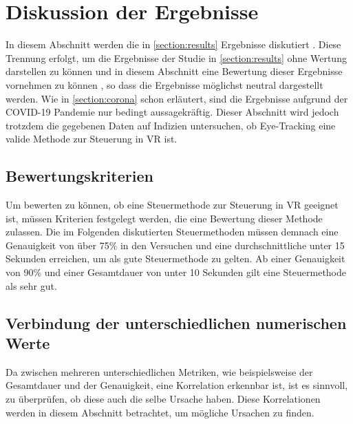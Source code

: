 
\chapter{Diskussion der Ergebnisse}
\label{section:discoussion}
In diesem Abschnitt werden die in \autoref{section:results} Ergebnisse diskutiert . Diese Trennung erfolgt, um die Ergebnisse der Studie in \autoref{section:results} ohne Wertung darstellen zu können und in diesem Abschnitt eine Bewertung dieser Ergebnisse  vornehmen zu können , so dass die Ergebnisse möglichst neutral dargestellt werden. Wie in \autoref{section:corona} schon erläutert, sind die Ergebnisse aufgrund der COVID-19 Pandemie nur bedingt aussagekräftig. Dieser Abschnitt wird jedoch trotzdem die gegebenen Daten auf Indizien untersuchen, ob Eye-Tracking eine valide Methode zur Steuerung in VR ist. 

\section{Bewertungskriterien}
\label{section:criteria}
Um bewerten zu können, ob eine Steuermethode zur Steuerung in VR geeignet ist, müssen Kriterien festgelegt werden, die eine Bewertung dieser Methode zulassen. Die im Folgenden diskutierten Steuermethoden müssen demnach eine Genauigkeit von über 75\% in den Versuchen und eine durchschnittliche unter 15 Sekunden erreichen, um als gute Steuermethode zu gelten. Ab einer Genauigkeit von 90\% und einer Gesamtdauer von unter 10 Sekunden gilt eine Steuermethode als sehr gut. 

\section{Verbindung der unterschiedlichen numerischen Werte}
Da zwischen mehreren unterschiedlichen Metriken, wie beispielsweise der Gesamtdauer und der Genauigkeit, eine Korrelation erkennbar ist, ist es sinnvoll, zu überprüfen, ob diese auch die selbe Ursache haben. Diese Korrelationen werden in diesem Abschnitt betrachtet, um mögliche Ursachen zu finden.

